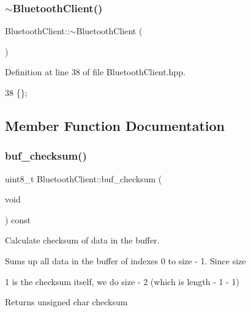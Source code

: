 \subsubsection{\texorpdfstring{$\sim$\+Bluetooth\+Client()}{~BluetoothClient()}}
{\footnotesize\ttfamily Bluetooth\+Client\+::$\sim$\+Bluetooth\+Client (\begin{DoxyParamCaption}{ }\end{DoxyParamCaption})\hspace{0.3cm}{\ttfamily [inline]}}



Definition at line 38 of file Bluetooth\+Client.\+hpp.


\begin{DoxyCode}
38 \{\};
\end{DoxyCode}


\subsection{Member Function Documentation}
\mbox{\label{class_bluetooth_client_a916ad4b917618bcc23dab0d258fe77d9}} 
\subsubsection{\texorpdfstring{buf\+\_\+checksum()}{buf\_checksum()}}
{\footnotesize\ttfamily uint8\+\_\+t Bluetooth\+Client\+::buf\+\_\+checksum (\begin{DoxyParamCaption}\item[{void}]{ }\end{DoxyParamCaption}) const\hspace{0.3cm}{\ttfamily [private]}}



Calculate checksum of data in the buffer. 

Sums up all data in the buffer of indexes 0 to size -\/ 1. Since size
\begin{DoxyItemize}
\item 1 is the checksum itself, we do size -\/ 2 (which is length -\/ 1 -\/ 1) \begin{DoxyReturn}{Returns}
unsigned char checksum 
\end{DoxyReturn}

\end{DoxyItemize}

